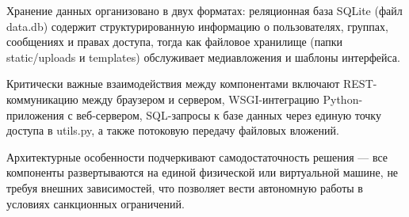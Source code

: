 Хранение данных организовано в двух форматах: реляционная база SQLite (файл data.db) содержит структурированную информацию о пользователях, группах, сообщениях и правах доступа, тогда как файловое хранилище (папки static/uploads и templates) обслуживает медиавложения и шаблоны интерфейса.  

Критически важные взаимодействия между компонентами включают REST-коммуникацию между браузером и сервером, WSGI-интеграцию Python-приложения с веб-сервером, SQL-запросы к базе данных через единую точку доступа в utils.py, а также потоковую передачу файловых вложений.  

Архитектурные особенности подчеркивают самодостаточность решения — все компоненты развертываются на единой физической или виртуальной машине, не требуя внешних зависимостей, что позволяет вести автономную работы в условиях санкционных ограничений.

